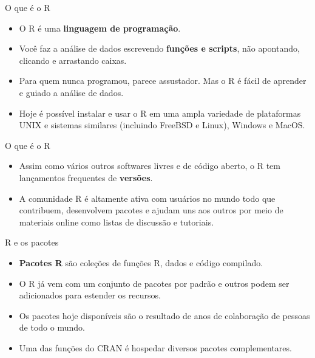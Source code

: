 \documentclass[
  ignorenonframetext,
  serif,
  professionalfont,
  usenames,
  dvipsnames,
  aspectratio = 169]{beamer}
\def\beginAHalfColumn{\begin{minipage}{0.49\textwidth}}%
\def\endColumns{\end{minipage}}%
\begin{document}
\begin{frame}{O que é o R}
\protect\hypertarget{o-que-uxe9-o-r}{}
\beginAHalfColumn

\begin{itemize}
\item
  O R é uma \textbf{linguagem de programação}.
\item
  Você faz a análise de dados escrevendo \textbf{funções e scripts}, não
  apontando, clicando e arrastando caixas.
\item
  Para quem nunca programou, parece assustador. Mas o R é fácil de
  aprender e guiado a análise de dados.
\item
  Hoje é possível instalar e usar o R em uma ampla variedade de
  plataformas UNIX e sistemas similares (incluindo FreeBSD e Linux),
  Windows e MacOS.
\end{itemize}

\endColumns
\beginAHalfColumn

\endColumns
\end{frame}

\begin{frame}{O que é o R}
\protect\hypertarget{o-que-uxe9-o-r-1}{}
\beginAHalfColumn

\begin{itemize}
\item
  Assim como vários outros softwares livres e de código aberto, o R tem
  lançamentos frequentes de \textbf{versões}.
\item
  A comunidade R é altamente ativa com usuários no mundo todo que
  contribuem, desenvolvem pacotes e ajudam uns aos outros por meio de
  materiais online como listas de discussão e tutoriais.
\end{itemize}

\endColumns
\beginAHalfColumn

\endColumns
\end{frame}

\begin{frame}{R e os pacotes}
\protect\hypertarget{r-e-os-pacotes}{}
\beginAHalfColumn

\begin{itemize}
\item
  \textbf{Pacotes R} são coleções de funções R, dados e código
  compilado.
\item
  O R já vem com um conjunto de pacotes por padrão e outros podem ser
  adicionados para estender os recursos.
\item
  Os pacotes hoje disponíveis são o resultado de anos de colaboração de
  pessoas de todo o mundo.
\item
  Uma das funções do CRAN é hospedar diversos pacotes complementares.
\end{itemize}

\endColumns
\beginAHalfColumn

\endColumns
\end{frame}
\end{document}
